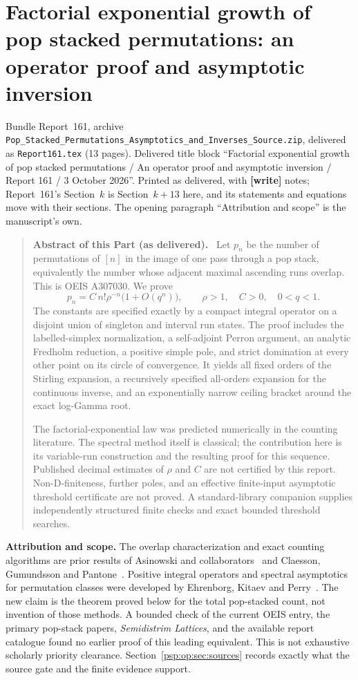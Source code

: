 \documentclass[11pt,letterpaper]{article}
\numberwithin{equation}{section}
\theoremstyle{remark}\newtheorem{remark}[theorem]{Remark}
\newcommand{\file}[1]{\nolinkurl{#1}}
\newenvironment{partabstract}{\begin{quote}\small\noindent\textbf{Abstract of this Part (as delivered).}\ }{\end{quote}}
\newcommand{\partsource}[1]{\par\noindent\begin{minipage}{\textwidth}\small #1\end{minipage}\par\medskip}
\begin{document}
\part{Factorial exponential growth of pop stacked permutations: an operator proof and asymptotic inversion}\label{psp:op:part}
\partsource{Bundle Report~161, archive \file{Pop_Stacked_Permutations_Asymptotics_and_Inverses_Source.zip}, delivered as \file{Report161.tex} (13 pages). Delivered title block ``Factorial exponential growth of pop stacked permutations / An operator proof and asymptotic inversion / Report 161 / 3 October 2026''. Printed as delivered, with \textbf{[write]} notes; Report~161's Section~$k$ is Section~$k+13$ here, and its statements and equations move with their sections. The opening paragraph ``Attribution and scope'' is the manuscript's own.}
\begin{partabstract}
Let $p_n$ be the number of permutations of $[n]$ in the image of one
pass through a pop stack, equivalently the number whose adjacent
maximal ascending runs overlap. This is OEIS A307030. We prove
\[
 p_n=C\,n!\rho^{-n}\bigl(1+O(q^n)\bigr),
 \qquad \rho>1,\quad C>0,\quad 0<q<1.
\]
The constants are specified exactly by a compact integral operator on
a disjoint union of singleton and interval run states. The proof
includes the labelled-simplex normalization, a self-adjoint Perron
argument, an analytic Fredholm reduction, a positive simple pole,
and strict domination at every other point on its circle of convergence.
It yields all fixed orders of the Stirling expansion, a recursively
specified all-orders expansion for the continuous inverse, and an
exponentially narrow ceiling bracket around the exact log-Gamma root.

The factorial-exponential law was predicted numerically in the
counting literature. The spectral method itself is classical; the
contribution here is its variable-run construction and the resulting
proof for this sequence. Published decimal estimates of $\rho$ and $C$
are not certified by this report. Non-D-finiteness, further poles,
and an effective finite-input asymptotic threshold certificate are
not proved. A standard-library companion supplies independently
structured finite checks and exact bounded threshold searches.
\end{partabstract}
\noindent\textbf{Attribution and scope.}
The overlap characterization and exact counting algorithms are prior
results of Asinowski and collaborators~\cite{abbhl,abh} and
Claesson, Gu\dh mundsson and Pantone~\cite{cgp}.
Positive integral operators and spectral asymptotics for permutation
classes were developed by Ehrenborg, Kitaev and Perry~\cite{ekp}.
The new claim is the theorem proved below for the total pop-stacked
count, not invention of those methods. A bounded check of the current
OEIS entry, the primary pop-stack papers, \emph{Semidistrim Lattices},
and the available report catalogue found no earlier proof of this
leading equivalent. This is not exhaustive scholarly priority
clearance. Section~\ref{psp:op:sec:sources} records exactly what the source
gate and the finite evidence support.
\end{document}
